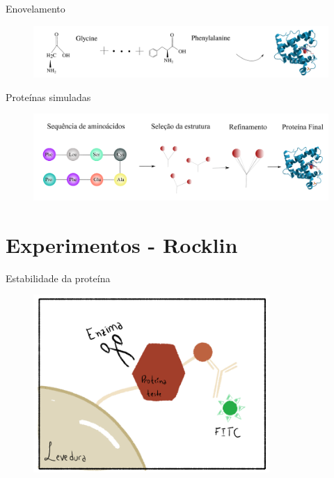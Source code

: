 \documentclass[10pt]{beamer}
\begin{document}
\begin{frame}{Enovelamento}
    \begin{figure}
        \centering
        \includegraphics[width=1.0\textwidth]{images/aminoplusprotein.pdf}
    \end{figure} 
\end{frame}

\begin{frame}{Proteínas simuladas}
    \begin{figure}
        \centering
        \includegraphics[width=1.0\textwidth]{images/computationalprotein.pdf}
    \end{figure} 
\end{frame}

\section{Experimentos - Rocklin}

\begin{frame}{Estabilidade da proteína} 
   \begin{figure}
        \centering
        \includegraphics[width=0.8\textwidth]{../images/yeast_cell.png}
    \end{figure} 
\end{frame}
\end{document}
